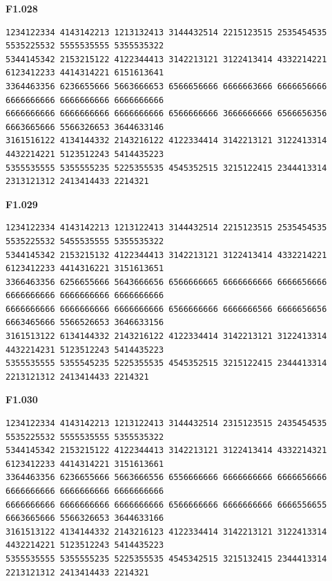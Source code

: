 \noindent\begin{minipage}{\linewidth}\textbf{F1.028}
\begin{lstlisting}
1234122334 4143142213 1213132413 3144432514 2215123515 2535454535 5535225532 5555535555 5355535322
5344145342 2153215122 4122344413 3142213121 3122413414 4332214221 6123412233 4414314221 6151613641
3364463356 6236655666 5663666653 6566656666 6666663666 6666656666 6666666666 6666666666 6666666666
6666666666 6666666666 6666666666 6566666666 3666666666 6566656356 6663665666 5566326653 3644633146
3161516122 4134144332 2143216122 4122334414 3142213121 3122413314 4432214221 5123512243 5414435223
5355535555 5355555235 5225355535 4545352515 3215122415 2344413314 2313121312 2413414433 2214321
\end{lstlisting}
\end{minipage}\par\smallskip

\noindent\begin{minipage}{\linewidth}\textbf{F1.029}
\begin{lstlisting}
1234122334 4143142213 1213122413 3144432514 2215123515 2535454535 5535225532 5455535555 5355535322
5344145342 2153215132 4122344413 3142213121 3122413414 4332214221 6123412233 4414316221 3151613651
3366463356 6256655666 5643666656 6566666665 6666666666 6666656666 6666666666 6666666666 6666666666
6666666666 6666666666 6666666666 6566666666 6666666566 6666656656 6663465666 5566526653 3646633156
3161513122 6134144332 2143216122 4122334414 3142213121 3122413314 4432214231 5123512243 5414435223
5355535555 5355545235 5225355535 4545352515 3215122415 2344413314 2213121312 2413414433 2214321
\end{lstlisting}
\end{minipage}\par\smallskip

\noindent\begin{minipage}{\linewidth}\textbf{F1.030}
\begin{lstlisting}
1234122334 4143142213 1213122413 3144432514 2315123515 2435454535 5535225532 5555535555 5355535322
5344145342 2153215122 4122344413 3142213121 3122413414 4332214321 6123412233 4414314221 3151613661
3364463356 6236655666 5663666556 6556666666 6666666666 6666656666 6666666666 6666666666 6666666666
6666666666 6666666666 6666666666 6566666666 6666666666 6666556655 6663665666 5566326653 3644633166
3161513122 4134144332 2143216123 4122334414 3142213121 3122413314 4432214221 5123512243 5414435223
5355535555 5355555235 5225355535 4545342515 3215132415 2344413314 2213121312 2413414433 2214321
\end{lstlisting}
\end{minipage}\par\smallskip

